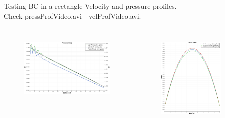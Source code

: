\documentclass{beamer}
\begin{document}
	\begin{frame}{Testing BC in a rectangle}
		Velocity and pressure profiles.\\
		Check pressProfVideo.avi - velProfVideo.avi.
		\begin{columns}
			\begin{figure}
				\centering
				
				\centering
				\includegraphics[width=\textwidth]{pics/pressDropBox.png}
				\label{}
			\end{figure}
		
			
			\begin{figure}
				\centering
				
				\includegraphics[width=0.8\textwidth]{pics/velDropBox.png}
				\label{}
			\end{figure}
		\end{columns}
	\end{frame}
	
\end{document}
